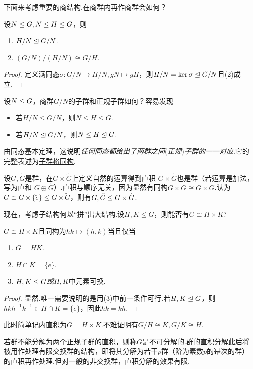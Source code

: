 下面来考虑重要的商结构.在商群内再作商群会如何？
\begin{thm}[(第二群同构)]
	设$N\trianglelefteq G,N\le H\trianglelefteq G$\footnotemark，则
	\begin{enumerate}
		\item $H/N\trianglelefteq G/N$.
		\item $(G/N)/(H/N)\cong G/H$.
	\end{enumerate}
\end{thm}
\begin{proof}
	定义满同态$\sigma\colon G/N\to H/N,gN\mapsto gH$，则$H/N=\ker\sigma\trianglelefteq G/N$且(2)成立.
\end{proof}

设$N\trianglelefteq G$，商群$G/N$的子群和正规子群如何？容易发现
\begin{itemize}
	\item 若$H/N\le G/N$，则$N\le H\le G$.
	\item 若$H/N\trianglelefteq G/N$，则$N\le H\trianglelefteq G$.
\end{itemize}
由同态基本定理，这说明\emph{任何同态都给出了两群之间}(\emph{正规})\emph{子群的一一对应}.它的完整表述为\hyperlink{thm:LatticeIso}{子群格同构}.

\medskip 设$G,\tilde{G}$是群，在$G\times\tilde{G}$上定义自然的运算得到{\heiti 直积} $G\times\tilde{G}$也是群（若运算是加法，写为{\heiti 直和} $G\oplus\tilde{G}$）.直积与顺序无关，因为显然有同构$G\times\tilde{G}\cong\tilde{G}\times G$.认为$G\cong G\times\{\tilde{e}\}\le G\times\tilde{G}	$，则有$G,\tilde{G}\trianglelefteq G\times\tilde{G}$.

现在，考虑子结构何以“拼”出大结构.设$H,K\le G$，则能否有$G\cong H\times K$?
\begin{prop}[(内直积)]
	$G\cong H\times K$且同构为$hk\mapsto(h,k)$当且仅当
	\begin{enumerate}
		\item $G=HK$.
		\item $H\cap K=\{e\}$.
		\item $H,K\trianglelefteq G$\emph{或}$H,K$中元素可换.
	\end{enumerate}
\end{prop}
\begin{proof}
	显然.唯一需要说明的是用(3)中前一条件可行.若$H,K\trianglelefteq G$，则$hkh^{-1}k^{-1}\in H\cap K=\{e\}$，因此$hk=kh$.
\end{proof}

此时简单记内直积为$G=H\times K$.不难证明有$G/H\cong K,G/K\cong H$.

\medskip 若群不能分解为两个正规子群的直积，则称$G$是{\heiti 不可分解的}.群的直积分解此后将被用作处理有限交换群的结构，即将其分解为若干$p${\heiti 群}（阶为素数$p$的幂次的群）的直积再作处理.但对一般的非交换群，直积分解的效果有限.

